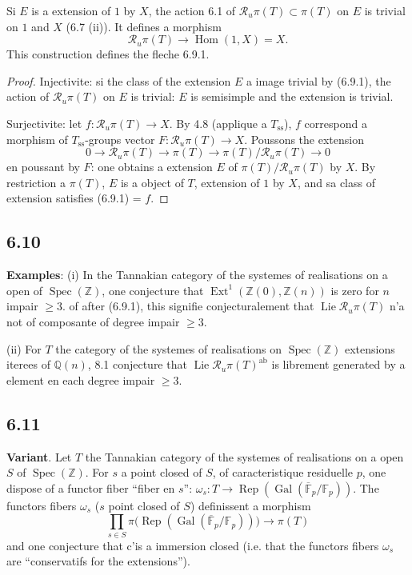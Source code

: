 \documentclass[12pt,a4paper]{article}
\theoremstyle{plain}
\theoremstyle{definition}
\theoremstyle{remark}
\DeclareMathOperator{\Hom}{Hom}
\DeclareMathOperator{\Spec}{Spec}
\DeclareMathOperator{\Gal}{Gal}
\DeclareMathOperator{\Ext}{Ext}
\DeclareMathOperator{\Lie}{Lie}
\DeclareMathOperator{\Rep}{Rep}
\newcommand{\ab}{\mathrm{ab}}
\newcommand{\Z}{\mathbb{Z}}
\newcommand{\Q}{\mathbb{Q}}
\newcommand{\F}{\mathbb{F}}
\begin{document}
Si $E$ is a extension of $1$ by $X$, the action 6.1 of $\mathcal{R}_u\pi(T) 
\subset 
\pi(T)$ on $E$ is trivial on $1$ and $X$ (6.7 (ii)). It defines a morphism
\[
\mathcal{R}_u\pi(T) 
\longrightarrow 
\Hom(1, X) = X.
\]
This construction defines the fleche 6.9.1.

\begin{proof}
Injectivite: si the class of the extension $E$ a image trivial by (6.9.1), the action of $\mathcal{R}_u\pi(T)$ on $E$ is trivial: $E$ is semisimple and the extension is trivial.

Surjectivite: let $f: 
\mathcal{R}_u\pi(T) 
\to X$. By 4.8 (applique a $T_{\mathrm{ss}}$), $f$ correspond a morphism of $T_{\mathrm{ss}}$-groups vector $F: 
\mathcal{R}_u\pi(T) 
\to X$. Poussons the extension
\[
0 
\longrightarrow 
\mathcal{R}_u\pi(T) 
\longrightarrow 
\pi(T) 
\longrightarrow 
\pi(T)/\mathcal{R}_u\pi(T) 
\longrightarrow 0
\]
en poussant by $F$: one obtains a extension $E$ of $\pi(T)/\mathcal{R}_u\pi(T)$ by $X$. By restriction a $\pi(T)$, $E$ is a object of $T$, extension of $1$ by $X$, and sa class of extension satisfies (6.9.1) = $f$.
\end{proof}

\subsection*{6.10}
\textbf{Examples}: (i) In the Tannakian category of the systemes of realisations on a open of $\Spec(\Z)$, one conjecture that $\Ext^1(\Z(0), 
\Z(n))$ is zero for $n$ impair $\geq 3$. of after (6.9.1), this signifie conjecturalement that $\Lie\mathcal{R}_u\pi(T)$ n'a not of composante of degree impair $\geq 3$.

(ii) For $T$ the category of the systemes of realisations on $\Spec(\Z)$ extensions iterees of $\Q(n)$, 8.1 conjecture that $\Lie\mathcal{R}_u\pi(T)^{\ab}$ is librement generated by a element en each degree impair $\geq 3$.

\subsection*{6.11}
\textbf{Variant}. Let $T$ the Tannakian category of the systemes of realisations on a open $S$ of $\Spec(\Z)$. For $s$ a point closed of $S$, of caracteristique residuelle $p$, one dispose of a functor fiber ``fiber en $s$'': $\omega_s: T 
\to 
\Rep(\Gal(\overline{\F}_p/\F_p))$. The functors fibers $\omega_s$ ($s$ point closed of $S$) definissent a morphism
\[
\prod_{s 
\in S} 
\pi\bigl(\Rep(\Gal(\overline{\F}_p/\F_p))\bigr) 
\longrightarrow 
\pi(T)
\]
and one conjecture that c'is a immersion closed (i.e. that the functors fibers $\omega_s$ are ``conservatifs for the extensions'').
\end{document}

